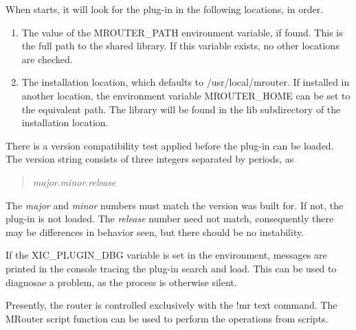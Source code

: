 When {\Xic} starts, it will look for the {\MRouter}
plug-in in the following locations, in order.
\begin{enumerate}
\item{The value of the {\vt MROUTER\_PATH} environment variable,
if found.  This is the full path to the shared library.  If this
variable exists, no other locations are checked.}

\item{The {\MRouter} installation location, which defaults to {\vt
/usr/local/mrouter}.  If installed in another location, the
environment variable {\vt MROUTER\_HOME} can be set to the equivalent
path.  The library will be found in the {\vt lib} subdirectory of the
installation location.}
\end{enumerate}

There is a version compatibility test applied before the plug-in can
be loaded.  The {\MRouter} version string consists of three integers
separated by periods, as

\begin{quote}
{\it major\/}{\vt .}{\it minor\/}{\vt .}{\it release}
\end{quote}

The {\it major} and {\it minor} numbers must match the version {\Xic}
was built for.  If not, the plug-in is not loaded.  The {\it release}
number need not match, consequently there may be differences in
behavior seen, but there should be no instability.

If the {\vt XIC\_PLUGIN\_DBG} variable is set in the environment,
messages are printed in the console tracing the plug-in search and
load.  This can be used to diagnosae a problem, as the process is
otherwise silent.

Presently, the router is controlled exclusively with the {\cb !mr}
text command.  The {\vt MRouter} script function can be used to
perform the operations from scripts.

